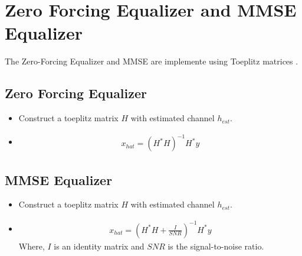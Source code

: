 \documentclass[journal,12pt,twocolumn]{IEEEtran}
\begin{document}
\section{Zero Forcing Equalizer and MMSE Equalizer}
The Zero-Forcing Equalizer and MMSE are implemente using Toeplitz matrices \cite{eq}.
\subsection{Zero Forcing Equalizer}
\begin{itemize}
\item Construct a toeplitz matrix $H$  with estimated channel $h_{est}$.
\item 
\begin{align}
x_{hat} = \left(H^{*}H\right)^{-1}H^{*}y
\end{align}
\end{itemize}
\subsection{MMSE Equalizer}
\begin{itemize}
\item Construct a toeplitz matrix $H$  with estimated channel $h_{est}$.
\item 
\begin{align}
x_{hat} = \left(H^{*}H + \frac{I}{SNR} \right)^{-1}H^{*}y
\end{align}
Where, $I$ is an identity matrix and $SNR$ is the signal-to-noise ratio.
\end{itemize}
\end{document}
